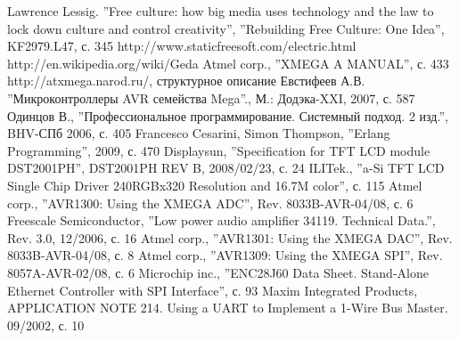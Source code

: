 \documentclass[russian,utf8,14pt,emptystyle,pointsubsection,reduceheight=15mm]{eskdtext}
\begin{document}
\begin{thebibliography}{99}
 Lawrence Lessig. ''Free culture: how big media uses technology and the law to lock down
culture and control creativity'', ''Rebuilding Free Culture: One Idea'', KF2979.L47, с. 345
 http://www.staticfreesoft.com/electric.html
 http://en.wikipedia.org/wiki/Geda
 Atmel corp., ''XMEGA A MANUAL'', с. 433
 http://atxmega.narod.ru/, структурное описание
 Евстифеев А.В. ''Микроконтроллеры AVR семейства Mega''., М.: Додэка-XXI, 2007, с. 587
 Одинцов В., ''Профессиональное программирование. Системный подход. 2 изд.'', BHV-СПб 2006, с. 405
 Francesco Cesarini, Simon Thompson, ''Erlang Programming'', 2009, с. 470
 Displaysun, ''Specification for TFT LCD module DST2001PH'', DST2001PH REV B, 2008/02/23, с. 24
 ILITek., ''a-Si TFT LCD Single Chip Driver 240RGBx320 Resolution and 16.7M color'', с. 115
 Atmel corp., ''AVR1300: Using the XMEGA ADC'', Rev. 8033B-AVR-04/08, с. 6
 Freescale Semiconductor, ''Low power audio amplifier 34119. Technical Data.'', Rev. 3.0, 12/2006, с. 16
 Atmel corp., ''AVR1301: Using the XMEGA DAC'', Rev. 8033B-AVR-04/08, с. 8
 Atmel corp., ''AVR1309: Using the XMEGA SPI'', Rev. 8057A-AVR-02/08, с. 6
 Microchip inc., ''ENC28J60 Data Sheet. Stand-Alone Ethernet Controller with SPI Interface'', с. 93
 Maxim Integrated Products, APPLICATION NOTE 214. Using a UART to Implement a 1-Wire Bus Master. 09/2002, с. 10

\end{thebibliography}


\end{document}
